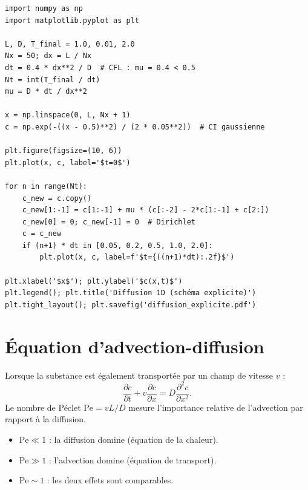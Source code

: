 \begin{codeblock}[title=\textbf{Diffusion 1D --- sch\'ema explicite}]
\begin{verbatim}
import numpy as np
import matplotlib.pyplot as plt

L, D, T_final = 1.0, 0.01, 2.0
Nx = 50; dx = L / Nx
dt = 0.4 * dx**2 / D  # CFL : mu = 0.4 < 0.5
Nt = int(T_final / dt)
mu = D * dt / dx**2

x = np.linspace(0, L, Nx + 1)
c = np.exp(-((x - 0.5)**2) / (2 * 0.05**2))  # CI gaussienne

plt.figure(figsize=(10, 6))
plt.plot(x, c, label='$t=0$')

for n in range(Nt):
    c_new = c.copy()
    c_new[1:-1] = c[1:-1] + mu * (c[:-2] - 2*c[1:-1] + c[2:])
    c_new[0] = 0; c_new[-1] = 0  # Dirichlet
    c = c_new
    if (n+1) * dt in [0.05, 0.2, 0.5, 1.0, 2.0]:
        plt.plot(x, c, label=f'$t={((n+1)*dt):.2f}$')

plt.xlabel('$x$'); plt.ylabel('$c(x,t)$')
plt.legend(); plt.title('Diffusion 1D (schéma explicite)')
plt.tight_layout(); plt.savefig('diffusion_explicite.pdf')
\end{verbatim}
\end{codeblock}

\section{\'Equation d'advection-diffusion}
\label{sec:advection_diffusion}

\begin{definition}
Lorsque la substance est \'egalement transport\'ee par un champ de
vitesse $v$ :
\[
  \frac{\partial c}{\partial t} + v\frac{\partial c}{\partial x}
  = D\frac{\partial^2 c}{\partial x^2}.
\]
Le nombre de P\'eclet $\mathrm{Pe}=vL/D$ mesure l'importance relative
de l'advection par rapport \`a la diffusion.
\end{definition}

\begin{proposition}
\begin{itemize}
  \item $\mathrm{Pe}\ll 1$ : la diffusion domine (\'equation de la chaleur).
  \item $\mathrm{Pe}\gg 1$ : l'advection domine (\'equation de transport).
  \item $\mathrm{Pe}\sim 1$ : les deux effets sont comparables.
\end{itemize}
\end{proposition}

